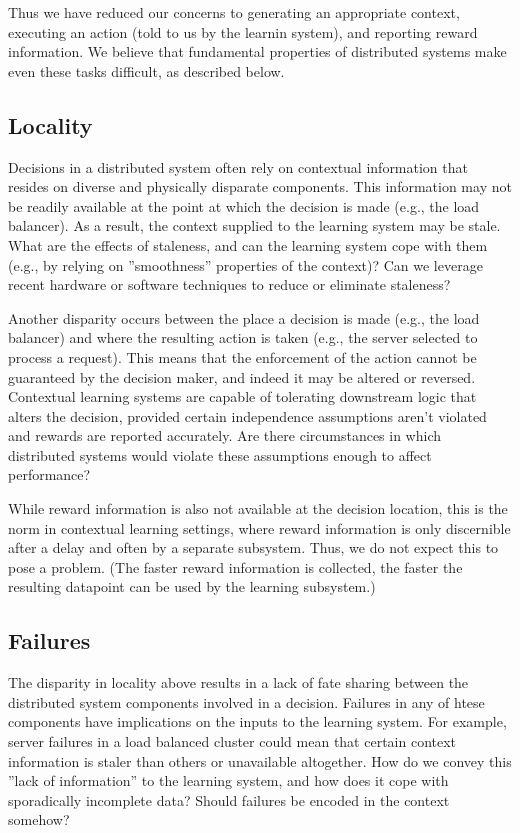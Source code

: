 \documentclass[a4paper,twocolumn]{article}
\begin{document}
Thus we have reduced our concerns to generating an appropriate context,
executing an action (told to us by the learnin system), and reporting reward
information.  We believe that fundamental properties of distributed systems make
even these tasks difficult, as described below.

\subsection*{Locality}

Decisions in a distributed system often rely on contextual information that
resides on diverse and physically disparate components. This information may not
be readily available at the point at which the decision is made (e.g., the load
balancer).  As a result, the context supplied to the learning system may be
stale. What are the effects of staleness, and can the learning system cope with
them (e.g., by relying on ''smoothness'' properties of the context)?  Can we
leverage recent hardware or software techniques to reduce or eliminate
staleness?

Another disparity occurs between the place a decision is made (e.g., the load
balancer) and where the resulting action is taken (e.g., the server selected to
process a request). This means that the enforcement of the action cannot be
guaranteed by the decision maker, and indeed it may be altered or reversed.
Contextual learning systems are capable of tolerating downstream logic
that alters the decision, provided certain independence assumptions
aren't violated and rewards are reported accurately. Are there circumstances in
which distributed systems would violate these assumptions enough to affect
performance?

While reward information is also not available at the decision location, this is
the norm in contextual learning settings, where reward information is only
discernible after a delay and often by a separate subsystem. Thus, we do not
expect this to pose a problem. (The faster reward information is collected, the
faster the resulting datapoint can be used by the learning subsystem.)

\subsection*{Failures}

The disparity in locality above results in a lack of fate sharing between the
distributed system components involved in a decision.  Failures in any of
htese components have implications on the inputs to the learning system. For
example, server failures in a load balanced cluster could mean that certain
context information is staler than others or unavailable altogether. How do we
convey this ''lack of information'' to the learning system, and how does it
cope with sporadically incomplete data? Should failures be encoded in the
context somehow?
\end{document}
